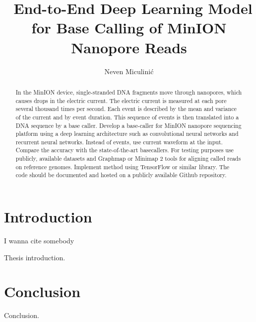 \documentclass[times, utf8, diplomski, english]{fer}
\begin{document}

\title{ End-to-End Deep Learning Model for Base Calling of MinION Nanopore Reads}

\author{Neven Miculinić}
\maketitle
 
\izvornik


\tableofcontents
\listoffigures
\listoftables

\chapter{Introduction}
I wanna cite somebody\citep{oetiket2007lshort}

Thesis introduction.

\chapter{Conclusion}
Conclusion.



% 

\begin{abstract}
In the MinION device, single-stranded DNA fragments move through nanopores, which causes drops in the electric current. The electric current is measured at each pore several thousand times per second. Each event is described by the mean and variance of the current and by event duration. This sequence of events is then translated into a DNA sequence by a base caller. Develop a base-caller for MinION nanopore sequencing platform using a deep learning architecture such as convolutional neural networks and recurrent neural networks. Instead of events, use current waveform at the input. Compare the accuracy with the state-of-the-art basecallers. For testing purposes use publicly, available datasets and Graphmap or Minimap 2 tools for aligning called reads on reference genomes.  Implement method using TensorFlow or similar library. The code should be documented and hosted on a publicly available Github repository.

\end{abstract}
\end{document}
